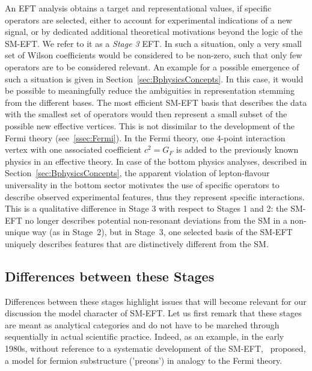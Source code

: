 An EFT analysis obtains a target and representational values, 
if specific operators are selected, either to account for
experimental indications of a new signal, or by dedicated additional theoretical 
motivations beyond the logic of the SM-EFT. 
We refer to it as a \emph{Stage 3} EFT.  
In such a situation, only a very small set
of Wilson coefficients would be considered to be non-zero, 
such that only few operators are to be considered relevant.
An example for a possible emergence of such a
situation is given in Section~\ref{sec:BphysicsConcepts}.
In this case, it would be possible to meaningfully reduce the
ambiguities in representation stemming from the different bases. The
most efficient SM-EFT basis that describes the data with the
smallest set of operators would then represent a small subset of the
possible new effective vertices.  This is not dissimilar to the
development of the Fermi theory (see~\ref{ssec:Fermi}). In the Fermi
theory, one 4-point interaction vertex with one associated coefficient
$c^2=G_F$ is added to the previously known physics in an effective
theory. 
In case of the bottom physics analyses, described in Section~\ref{sec:BphysicsConcepts}, the apparent
violation of lepton-flavour universality in the bottom sector motivates
the use of specific operators to describe observed experimental
features, thus they represent specific interactions. This is a
qualitative difference in Stage 3 with respect to Stages 1 and 2: the SM-EFT
no longer describes potential non-resonant deviations from the
SM in a non-unique way (as in Stage~2), 
but in Stage~3, one selected basis of the SM-EFT uniquely describes features that are distinctively different from the SM.

\subsection{Differences between these Stages}

Differences between these stages highlight issues that will become
relevant for our discussion the model character of SM-EFT.
Let us first remark that these stages are meant as analytical categories and do not have to be 
marched through sequentially in actual scientific practice.
Indeed, as an example, in the early 1980s, without reference to
a systematic development of the SM-EFT,~\cite{Eichten:1983hw} proposed,
a model for fermion substructure ('preons') in analogy to the Fermi theory.


